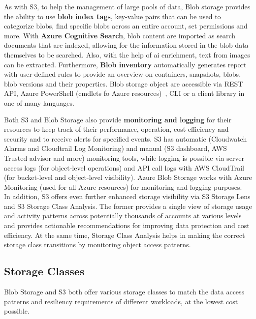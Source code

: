 As with S3, to help the management of large pools of data, Blob storage provides the ability to use \textbf{blob index tags}, key-value pairs that can be used to categorize blobs, find specific blobs across an entire account, set permissions and more. With \textbf{Azure Cognitive Search}, blob content are imported as search documents that are indexed, allowing for the information stored in the blob data themselves to be searched. Also, with the help of \ac{ai} enrichment, text from images can be extracted. Furthermore,  \textbf{Blob inventory} automatically generates report with user-defined rules to provide an overview on containers, snapshots, blobs, blob versions and their properties. Blob storage object are accessible via REST API, Azure PowerShell (cmdlets fo Azure resources)~\cite{powershell}, CLI or a client library in one of many languages.~\cite{blobinfo}

Both S3 and Blob Storage also provide\textbf{ monitoring and logging} for their resources to keep track of their performance, operation, cost efficiency and security and to receive alerts for specified events. S3 has automatic (Cloudwatch Alarms and Cloudtrail Log Monitoring) and manual (S3 dashboard, AWS Trusted advisor and more) monitoring tools, while logging is possible via server access logs (for object-level operations) and API call logs with AWS CloudTrail (for bucket-level and object-level visibility). Azure Blob Storage works with Azure Monitoring (used for all Azure resources) for monitoring and logging purposes. ~\cite{s3monitoring,blobmonitoring} In addition, S3 offers even further enhanced storage visibility via S3 Storage Lens and S3 Storage Class Analysis. The former provides a single view of storage usage and activity patterns across potentially thousands of accounts at various levels and provides actionable recommendations for improving data protection and cost efficiency. At the same time, Storage Class Analysis helps in making the correct storage class transitions by monitoring object access patterns. ~\cite{s3analytics}

\subsection{Storage Classes}
Blob Storage and S3 both offer various storage classes to match the data access patterns and resiliency requirements of different workloads, at the lowest cost possible.

